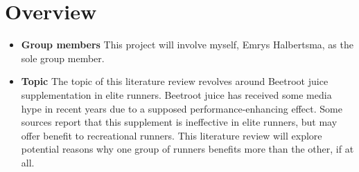 \section{Overview}
\begin{itemize}
    \item \textbf{Group members} This project will involve myself, Emrys Halbertsma, as the sole group member. 
    \item \textbf{Topic} The topic of this literature review revolves around Beetroot juice supplementation in elite runners. Beetroot juice has received some media hype in recent years due to a supposed performance-enhancing effect. Some sources report that this supplement is ineffective in elite runners, but may offer benefit to recreational runners. This literature review will explore potential reasons why one group of runners benefits more than the other, if at all.
\end{itemize}